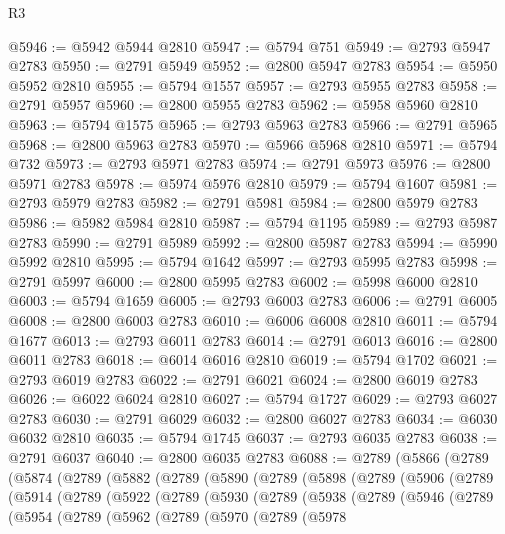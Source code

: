 \begin{lexlean}{R3}
\begin{coremodule}
@5946 := @5942 @5944 @2810
@5947 := @5794 @751
@5949 := @2793 @5947 @2783
@5950 := @2791 @5949
@5952 := @2800 @5947 @2783
@5954 := @5950 @5952 @2810
@5955 := @5794 @1557
@5957 := @2793 @5955 @2783
@5958 := @2791 @5957
@5960 := @2800 @5955 @2783
@5962 := @5958 @5960 @2810
@5963 := @5794 @1575
@5965 := @2793 @5963 @2783
@5966 := @2791 @5965
@5968 := @2800 @5963 @2783
@5970 := @5966 @5968 @2810
@5971 := @5794 @732
@5973 := @2793 @5971 @2783
@5974 := @2791 @5973
@5976 := @2800 @5971 @2783
@5978 := @5974 @5976 @2810
@5979 := @5794 @1607
@5981 := @2793 @5979 @2783
@5982 := @2791 @5981
@5984 := @2800 @5979 @2783
@5986 := @5982 @5984 @2810
@5987 := @5794 @1195
@5989 := @2793 @5987 @2783
@5990 := @2791 @5989
@5992 := @2800 @5987 @2783
@5994 := @5990 @5992 @2810
@5995 := @5794 @1642
@5997 := @2793 @5995 @2783
@5998 := @2791 @5997
@6000 := @2800 @5995 @2783
@6002 := @5998 @6000 @2810
@6003 := @5794 @1659
@6005 := @2793 @6003 @2783
@6006 := @2791 @6005
@6008 := @2800 @6003 @2783
@6010 := @6006 @6008 @2810
@6011 := @5794 @1677
@6013 := @2793 @6011 @2783
@6014 := @2791 @6013
@6016 := @2800 @6011 @2783
@6018 := @6014 @6016 @2810
@6019 := @5794 @1702
@6021 := @2793 @6019 @2783
@6022 := @2791 @6021
@6024 := @2800 @6019 @2783
@6026 := @6022 @6024 @2810
@6027 := @5794 @1727
@6029 := @2793 @6027 @2783
@6030 := @2791 @6029
@6032 := @2800 @6027 @2783
@6034 := @6030 @6032 @2810
@6035 := @5794 @1745
@6037 := @2793 @6035 @2783
@6038 := @2791 @6037
@6040 := @2800 @6035 @2783
@6088 := @2789
    (@5866
      (@2789
        (@5874
          (@2789
            (@5882
              (@2789
                (@5890
                  (@2789
                    (@5898
                      (@2789
                        (@5906
                          (@2789
                            (@5914
                              (@2789
                                (@5922
                                  (@2789
                                    (@5930
                                      (@2789
                                        (@5938
                                          (@2789
                                            (@5946
                                              (@2789
                                                (@5954
                                                  (@2789
                                                    (@5962
                                                      (@2789
                                                        (@5970
                                                          (@2789
                                                            (@5978

\end{coremodule}
\end{lexlean}
